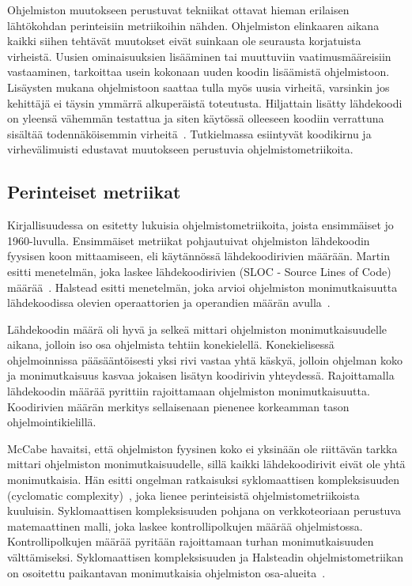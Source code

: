 \documentclass[finnish]{tktltiki2}
\theoremstyle{definition}
\theoremstyle{remark}
\begin{document}
Ohjelmiston muutokseen perustuvat tekniikat ottavat hieman erilaisen lähtökohdan perinteisiin metriikoihin nähden. Ohjelmiston elinkaaren aikana kaikki siihen tehtävät muutokset eivät suinkaan ole seurausta korjatuista virheistä. Uusien ominaisuuksien lisääminen tai muuttuviin vaatimusmääreisiin vastaaminen, tarkoittaa usein kokonaan uuden koodin lisäämistä ohjelmistoon. Lisäysten mukana ohjelmistoon saattaa tulla myös uusia virheitä, varsinkin jos kehittäjä ei täysin ymmärrä alkuperäistä toteutusta. Hiljattain lisätty lähdekoodi on yleensä vähemmän testattua ja siten käytössä olleeseen koodiin verrattuna sisältää todennäköisemmin virheitä~\cite{ME98}. Tutkielmassa esiintyvät koodikirnu ja virhevälimuisti edustavat muutokseen perustuvia ohjelmistometriikoita.

\subsection{Perinteiset metriikat}

Kirjallisuudessa on esitetty lukuisia ohjelmistometriikoita, joista ensimmäiset jo 1960-luvulla. Ensimmäiset metriikat pohjautuivat ohjelmiston lähdekoodin fyysisen koon mittaamiseen, eli käytännössä lähdekoodirivien määrään. Martin esitti menetelmän, joka laskee lähdekoodirivien (SLOC - Source Lines of Code) määrää~\cite{M65}. Halstead esitti menetelmän, joka arvioi ohjelmiston monimutkaisuutta lähdekoodissa olevien operaattorien ja operandien määrän avulla~\cite{H72, H77}.

Lähdekoodin määrä oli hyvä ja selkeä mittari ohjelmiston monimutkaisuudelle aikana, jolloin iso osa ohjelmista tehtiin konekielellä. Konekielisessä ohjelmoinnissa pääsääntöisesti yksi rivi vastaa yhtä käskyä, jolloin ohjelman koko ja monimutkaisuus kasvaa jokaisen lisätyn koodirivin yhteydessä. Rajoittamalla lähdekoodin määrää pyrittiin rajoittamaan ohjelmiston monimutkaisuutta. Koodirivien määrän merkitys sellaisenaan pienenee korkeamman tason ohjelmointikielillä.

McCabe havaitsi, että ohjelmiston fyysinen koko ei yksinään ole riittävän tarkka mittari ohjelmiston monimutkaisuudelle, sillä kaikki lähdekoodirivit eivät ole yhtä monimutkaisia. Hän esitti ongelman ratkaisuksi syklomaattisen kompleksisuuden (cyclomatic complexity)~\cite{M76}, joka lienee perinteisistä ohjelmistometriikoista kuuluisin. Syklomaattisen kompleksisuuden pohjana on verkkoteoriaan perustuva matemaattinen malli, joka laskee kontrollipolkujen määrää ohjelmistossa. Kontrollipolkujen määrää pyritään rajoittamaan turhan monimutkaisuuden välttämiseksi. Syklomaattisen kompleksisuuden ja Halsteadin ohjelmistometriikan on osoitettu paikantavan monimutkaisia ohjelmiston osa-alueita~\cite{CSM79}.
\end{document}
